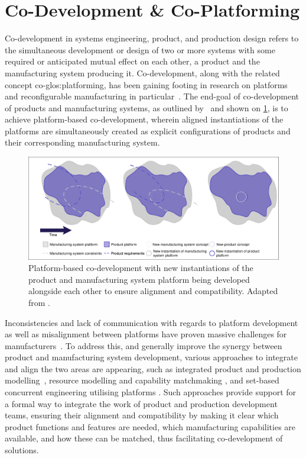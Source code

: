\section{Co-Development \& Co-Platforming}\label{sec:coDevPltf}
Co-development in systems engineering, product, and production design refers to the simultaneous development or design of two or more systems with some required or anticipated mutual effect on each other, \eg{} a product and the manufacturing system producing it.
Co-development, along with the related concept co-\gls{glos:platforming}, has been gaining footing in research on platforms and reconfigurable manufacturing in particular~\parencite{MichaelisJohannesson,ElMaraghy2015407}.
The end-goal of co-development of products and manufacturing systems, as outlined by~\textcite{MichaelisJohannesson} and shown on \cref{fig:pltfCoDev}, is to achieve platform-based co-development, wherein aligned instantiations of the platforms are simultaneously created as explicit configurations of products and their corresponding manufacturing system.
\begin{figure}[tb]
	\includegraphics[width=\textwidth, trim=2 2 2 2, clip]{mainmatter/introduction/figures/pltfCoDev.pdf}
	\caption[Platform-based co-development.]
	{Platform-based co-development with new instantiations of the product and manufacturing system platform being developed alongside each other to ensure alignment and compatibility.
	Adapted from \textcite{MichaelisJohannesson}.}\label{fig:pltfCoDev}
\end{figure}

Inconsistencies and lack of communication with regards to platform development as well as misalignment between platforms have proven massive challenges for manufacturers~\parencite{SorensenAPMS2018}.
To address this, and generally improve the synergy between product and manufacturing system development, various approaches to integrate and align the two areas are appearing, such as integrated product and production modelling~\parencite{Michaelis2015203,BRUNOE2018592,BrunoePPModel}, resource modelling and capability matchmaking \parencite{7750724,JARVENPAA201887,dhunganaMarket}, and set-based concurrent engineering utilising platforms \parencite{Levandowski2014,Levandowski01092014,LANDAHL201661}.
Such approaches provide support for a formal way to integrate the work of product and production development teams, ensuring their alignment and compatibility by making it clear which product functions and features are needed, which manufacturing capabilities are available, and how these can be matched, thus facilitating co-development of solutions.